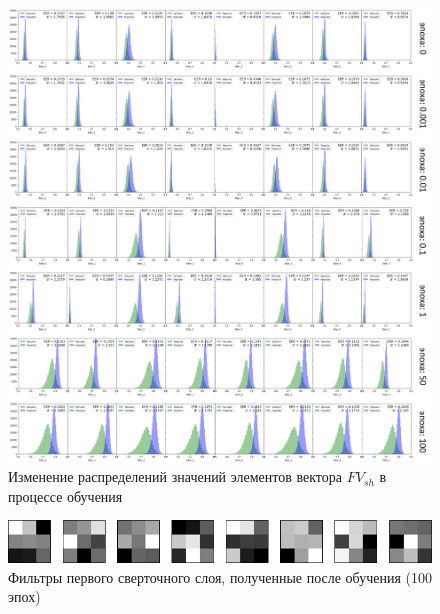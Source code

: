 \begin{figure}[t!]
	\begin{center}
		\includegraphics[width=.95\linewidth]{pictures/shfv-distributions-combined.png}
	\end{center}
	\caption{Изменение распределений значений элементов вектора $FV_{sh}$ в процессе обучения}
	\label{fig:shfv-distributions-combined}
\end{figure}

\begin{figure}[h]
	\begin{center}
		\includegraphics[width=.95\linewidth]{pictures/shfv-filters-100-epoch.png}
	\end{center}
	\caption{Фильтры первого сверточного слоя, полученные после обучения (100 эпох)}
	\label{fig:shfv-filters-100-epoch}
\end{figure}

